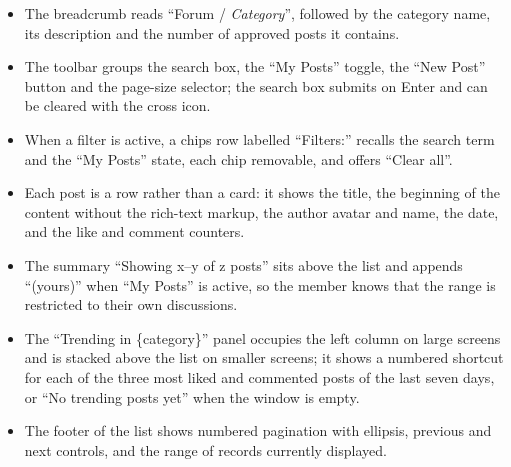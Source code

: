\begin{itemize}[leftmargin=1.6em,topsep=3pt,itemsep=2pt,parsep=0pt,label=$\bullet$]
      \item The breadcrumb reads ``Forum / \textit{Category}'', followed by the category
            name, its description and the number of approved posts it contains.
      \item The toolbar groups the search box, the ``My Posts'' toggle, the ``New Post''
            button and the page-size selector; the search box submits on Enter and can be
            cleared with the cross icon.
      \item When a filter is active, a chips row labelled ``Filters:'' recalls the search
            term and the ``My Posts'' state, each chip removable, and offers ``Clear all''.
      \item Each post is a row rather than a card: it shows the title, the beginning of the
            content without the rich-text markup, the author avatar and name, the date, and
            the like and comment counters.
      \item The summary ``Showing x--y of z posts'' sits above the list and appends
            ``(yours)'' when ``My Posts'' is active, so the member knows that the range is
            restricted to their own discussions.
      \item The ``Trending in \{category\}'' panel occupies the left column on large
            screens and is stacked above the list on smaller screens; it shows a numbered
            shortcut for each of the three most liked and commented posts of the last seven
            days, or ``No trending posts yet'' when the window is empty.
      \item The footer of the list shows numbered pagination with ellipsis, previous and
            next controls, and the range of records currently displayed.
\end{itemize}


